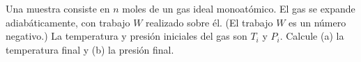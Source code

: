 \item Una muestra consiste en $n$ moles de un gas ideal monoatómico. El gas se expande adiabáticamente, con trabajo $W$ realizado sobre él. (El trabajo $W$ es un número negativo.) La temperatura y presión iniciales del gas son $T_i$ y $P_i$. Calcule (a) la temperatura final y (b) la presión final.
